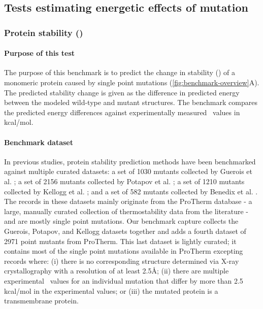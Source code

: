 \subsection{Tests estimating energetic effects of mutation}

\subsubsection{Protein stability (\ddg)}

\paragraph{Purpose of this test}

The purpose of this benchmark is to predict the change in stability (\ddg) of a monomeric protein caused by single point mutations (\cref{fig:benchmark-overview}A). The predicted stability change is given as the difference in predicted energy between the modeled wild-type and mutant structures. The benchmark compares the predicted energy differences against experimentally measured \ddg\ values in kcal/mol.

\paragraph{Benchmark dataset}

In previous studies, protein stability prediction methods have been benchmarked against multiple curated datasets: a set of 1030 mutants collected by Guerois et al. \cite{guerois_predicting_2002}; a set of 2156 mutants collected by Potapov et al. \cite{potapov_assessing_2009}; a set of 1210 mutants collected by Kellogg et al. \cite{kellogg_role_2011}; and a set of 582 mutants collected by Benedix et al. \cite{benedix_predicting_2009}. The records in these datasets mainly originate from the ProTherm database \cite{kumar_protherm_2006} - a large, manually curated collection of thermostability data from the literature - and are mostly single point mutations. Our benchmark capture collects the Guerois, Potapov, and Kellogg datasets together and adds a fourth dataset of 2971 point mutants from ProTherm. This last dataset is lightly curated; it contains most of the single point mutations available in ProTherm excepting records where: (i) there is no corresponding structure determined via X-ray crystallography with a resolution of at least 2.5Å; (ii) there are multiple experimental \ddg\ values for an individual mutation that differ by more than 2.5 kcal/mol in the experimental values; or (iii) the mutated protein is a transmembrane protein.

